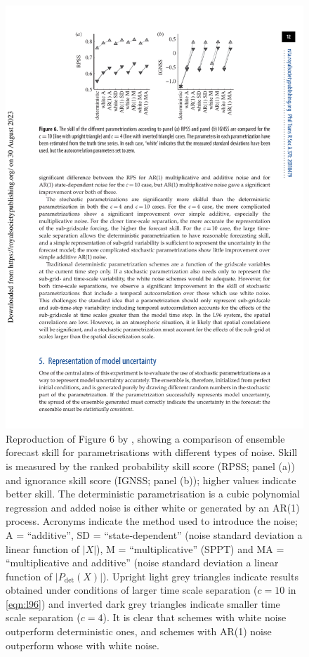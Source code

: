 \documentclass[titlepage,twoside]{article}
\numberwithin{equation}{section}
\begin{document}
\begin{figure}[ht]
    \centering
    \includegraphics[width=0.6\linewidth]{figures/arnold2013_fig6.pdf}
    \caption{
        Reproduction of Figure 6 by \textcite{arnold2013}, showing a comparison
        of ensemble forecast skill for parametrisations with different types of
        noise. Skill is measured by the ranked probability skill score (RPSS;
        panel (a)) and ignorance skill score (IGNSS; panel (b)); higher values
        indicate better skill. The deterministic parametrisation is a cubic
        polynomial regression and added noise is either white or generated
        by an AR(1) process. Acronyms indicate the method used to introduce
        the noise; A = ``additive'', SD = ``state-dependent'' (noise standard
        deviation a linear function of $|X|$), M = ``multiplicative'' (SPPT)
        and MA = ``multiplicative and additive'' (noise standard deviation a
        linear function of $|P_\mathrm{det}(X)|$). Upright light grey triangles
        indicate results obtained under conditions of larger time scale
        separation ($c=10$ in \cref{eqn:l96}) and inverted dark grey triangles
        indicate smaller time scale separation ($c=4$). It is clear that
        schemes with white noise outperform deterministic ones, and schemes
        with AR(1) noise outperform whose with white noise.
    }
    \label{fig:arnold_fig6}
\end{figure}
\end{document}
